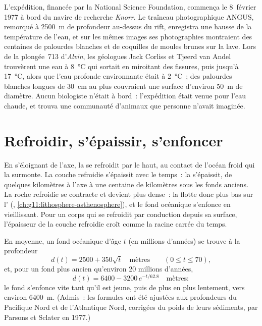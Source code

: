 \begin{history}
L'expédition, financée par la National Science Foundation, commença le
8~février 1977 à bord du navire de recherche \emph{Knorr}. Le traîneau
photographique ANGUS, remorqué à \qty{2500}{m} de profondeur au-dessus du
rift, enregistra une hausse de la température de l'eau, et sur les mêmes
images ses photographies montraient des centaines de palourdes blanches et
de coquilles de moules brunes sur la lave. Lors de la plongée~713
d'\emph{Alvin}, les géologues Jack Corliss et Tjeerd van Andel trouvèrent
une eau à \qty{8}{\celsius} qui sortait en miroitant des fissures, puis
jusqu'à \qty{17}{\celsius}, alors que l'eau profonde environnante était à
\qty{2}{\celsius}~; des palourdes blanches longues de \qty{30}{cm} au plus
couvraient une surface d'environ \qty{50}{m} de diamètre. Aucun biologiste
n'était à bord~: l'expédition était venue pour l'eau chaude, et trouva une
communauté d'animaux que personne n'avait imaginée.
\end{history}

\section{Refroidir, s'épaissir, s'enfoncer}

En s'éloignant de l'axe, la  se refroidit par le haut, au
contact de l'océan froid qui la surmonte. La couche refroidie s'épaissit
avec le temps~: la  s'épaissit, de quelques kilomètres à l'axe à
une centaine de kilomètres sous les fonds anciens. La roche refroidie se
contracte et devient plus dense~: la  flotte donc plus bas sur
l' (, \cref{ch:g11:lithosphere-asthenosphere}), et le
fond océanique s'enfonce en vieillissant. Pour un corps qui se refroidit
par conduction depuis sa surface, l'épaisseur de la couche refroidie croît
comme la racine carrée du temps.

\begin{proposition}\label{prop:g11:ocean-ridges:depth-age}
En moyenne, un fond océanique d'âge $t$ (en millions d'années) se trouve à
la profondeur
\[
  d(t) = 2500 + 350\sqrt{t} \quad \text{mètres} \qquad (0 \le t \le 70),
\]
et, pour un fond plus ancien qu'environ 20 millions d'années,
\[
  d(t) = 6400 - 3200\,e^{-t/62.8} \quad \text{mètres}:
\]
le fond s'enfonce vite tant qu'il est jeune, puis de plus en plus
lentement, vers environ \qty{6400}{m}. (Admis~: les formules ont été
ajustées aux profondeurs du Pacifique Nord et de l'Atlantique Nord,
corrigées du poids de leurs sédiments, par Parsons et Sclater en 1977.)
\end{proposition}

